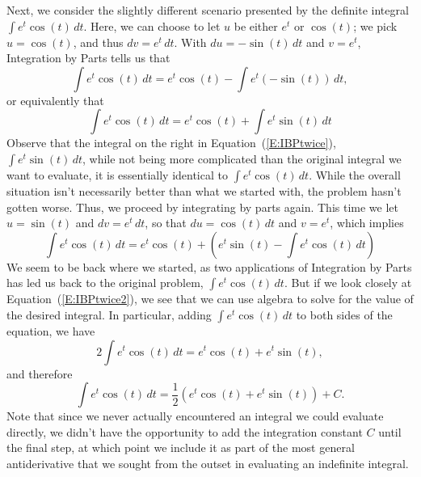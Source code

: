 Next, we consider the slightly different scenario presented by the definite integral $\int e^t \cos(t) \, dt$.  Here, we can choose to let $u$ be either $e^t$ or $\cos(t)$; we pick $u = \cos(t)$, and thus $dv = e^t \, dt$.  With $du = -\sin(t) \, dt$ and $v = e^t$, Integration by Parts tells us that
$$\int e^t \cos(t) \, dt = e^t \cos(t) - \int e^t (-\sin(t))\, dt,$$
or equivalently that
\begin{equation} \label{E:IBPtwice}
\int e^t \cos(t) \, dt = e^t \cos(t) + \int e^t \sin(t) \, dt
\end{equation}
Observe that the integral on the right in Equation~(\ref{E:IBPtwice}), \\ $\int e^t \sin(t) \, dt$, while not being more complicated than the original integral we want to evaluate, it is essentially identical to $\int e^t \cos(t) \, dt$.  While the overall situation isn't necessarily better than what we started with, the problem hasn't gotten worse.  Thus, we proceed by integrating by parts again.  This time we let $u = \sin(t)$ and $dv = e^t \, dt$, so that $du = \cos(t) \, dt$ and $v = e^t$, which implies
\begin{equation} \label{E:IBPtwice2}
\int e^t \cos(t) \, dt = e^t \cos(t) + \left( e^t \sin(t) - \int e^t \cos(t) \, dt \right)
\end{equation}
We seem to be back where we started, as two applications of Integration by Parts has led us back to the original problem, $\int e^t \cos(t) \, dt$.  But if we look closely at Equation~(\ref{E:IBPtwice2}), we see that we can use algebra to solve for the value of the desired integral.  In particular, adding $\int e^t \cos(t) \, dt$ to both sides of the equation, we have 
$$2 \int e^t \cos(t) \, dt = e^t \cos(t) +  e^t \sin(t),$$
and therefore 
$$ \int e^t \cos(t) \, dt = \frac{1}{2} \left( e^t \cos(t) +  e^t \sin(t) \right) + C.$$
Note that since we never actually encountered an integral we could evaluate directly, we didn't have the opportunity to add the integration constant $C$ until the final step, at which point we include it as part of the most general antiderivative that we sought from the outset in evaluating an indefinite integral.



